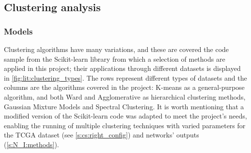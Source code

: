 \subsection{Clustering analysis} \label{s:lit:clustering}

\subsubsection*{Models} \label{s:lit:cs_models}

Clustering algorithms have many variations, and these are covered the code sample \cite{Scikit-learn_undated-ax} from the Scikit-learn library \cite{Pedregosa2011-ts} from which a selection of methods are applied in this project; their applications through different datasets is displayed in \cref{fig:lit:clustering_types}. The rows represent different types of datasets and the columns are the algorithms covered in the project: K-means as a general-purpose algorithm, and both Ward and Agglomerative as hierarchical clustering methods, Gaussian Mixture Models and Spectral Clustering. It is worth mentioning that a modified version of the Scikit-learn code was adapted to meet the project's needs, enabling the running of multiple clustering techniques with varied parameters for the TCGA dataset (see \cref{s:cs:right_config}) and networks' outputs (\cref{s:N_I:methods}).

